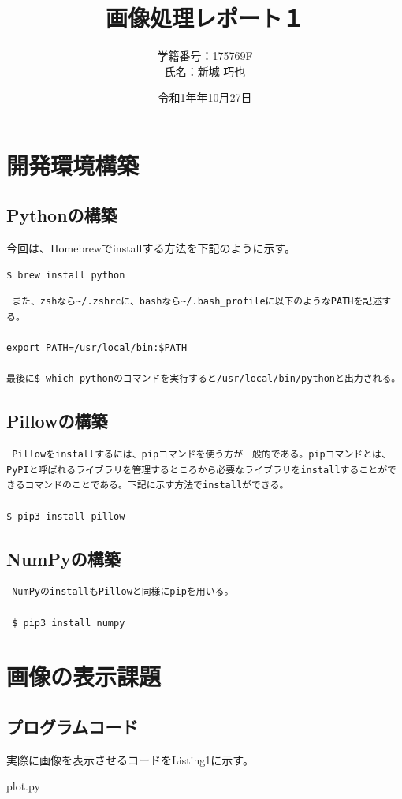 \documentclass[a4paper,11pt,titlepage]{jarticle}
\title{画像処理レポート１} %
\author{学籍番号：175769F \\ 氏名：新城 巧也}
\date{令和1年年10月27日}
\begin{document}
\maketitle
\tableofcontents %
\clearpage

\section{開発環境構築}
\subsection{Pythonの構築}
今回は、Homebrewでinstallする方法を下記のように示す。

\begin{verbatim}
$ brew install python 
\end{verbatim}
\begin{verbatim}
 また、zshなら~/.zshrcに、bashなら~/.bash_profileに以下のようなPATHを記述する。

export PATH=/usr/local/bin:$PATH

最後に$ which pythonのコマンドを実行すると/usr/local/bin/pythonと出力される。
\end{verbatim}
\subsection{Pillowの構築}

\begin{verbatim}
 Pillowをinstallするには、pipコマンドを使う方が一般的である。pipコマンドとは、PyPIと呼ばれるライブラリを管理するところから必要なライブラリをinstallすることができるコマンドのことである。下記に示す方法でinstallができる。

$ pip3 install pillow
\end{verbatim}

\subsection{NumPyの構築}
\begin{verbatim}
 NumPyのinstallもPillowと同様にpipを用いる。

 $ pip3 install numpy
\end{verbatim}
\section{画像の表示課題}
\subsection{プログラムコード}
実際に画像を表示させるコードをListing1に示す。

{plot.py}\label{ex3}
\end{document}
